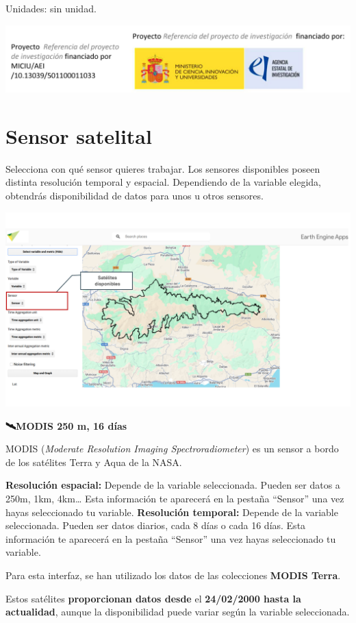 \documentclass[
]{book}
\begin{document}
Unidades: sin unidad.

\includegraphics{assets/logo.jpeg}

\chapter{Sensor satelital}\label{sensor}

Selecciona con qué sensor quieres trabajar. Los sensores disponibles poseen distinta resolución temporal y espacial. Dependiendo de la variable elegida, obtendrás disponibilidad de datos para unos u otros sensores.

\includegraphics{assets/sensor_es.png}

\textbf{🛰️MODIS 250 m, 16 días}

MODIS (\emph{Moderate Resolution Imaging Spectroradiometer}) es un sensor a bordo de los satélites Terra y Aqua de la NASA.

\textbf{Resolución espacial:} Depende de la variable seleccionada. Pueden ser datos a 250m, 1km, 4km\ldots{} Esta información te aparecerá en la pestaña ``Sensor'' una vez hayas seleccionado tu variable.
\textbf{Resolución temporal:} Depende de la variable seleccionada. Pueden ser datos diarios, cada 8 días o cada 16 días. Esta información te aparecerá en la pestaña ``Sensor'' una vez hayas seleccionado tu variable.

Para esta interfaz, se han utilizado los datos de las colecciones \textbf{MODIS Terra}.

Estos satélites \textbf{proporcionan datos desde} el \textbf{24/02/2000 hasta la actualidad}, aunque la disponibilidad puede variar según la variable seleccionada.
\end{document}
